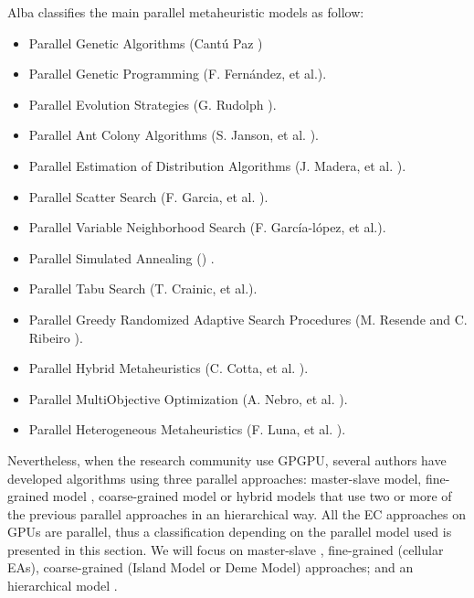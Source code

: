 \documentclass[prodmode,acmtecs]{acmsmall}
\begin{document}
Alba classifies the main parallel metaheuristic models as follow:
\begin{itemize}
 \item Parallel Genetic Algorithms (Cant\'u Paz \cite{Cantu-Paz98asurvey}) %
\item Parallel Genetic Programming (F. Fernández, et al.\cite{springerlink:10.1023_A:1021873026259}).
\item Parallel Evolution Strategies (G. Rudolph \cite{Rudolph92parallelapproaches}).
\item Parallel Ant Colony Algorithms (S. Janson, et al. \cite{ParallelAntColony}).
\item Parallel Estimation of Distribution Algorithms (J. Madera, et al. \cite{springerlink:10.1007_3_540_32494_1_7}).
\item Parallel Scatter Search (F. Garcia, et al. \cite{GarciaLopez2003575}).
\item Parallel Variable Neighborhood Search (F. Garc\'ia-l\'opez, et al.\cite{Garcia_lopez_theparallel}).
\item Parallel Simulated Annealing (\cite{Genetic_parallelsimulated}) .
\item Parallel Tabu Search (T. Crainic, et al.\cite{Crainic97towardsa}).
\item Parallel Greedy Randomized Adaptive Search Procedures (M. Resende and C. Ribeiro \cite{Resendeparallelgreedy}).
\item Parallel Hybrid Metaheuristics (C. Cotta, et al. \cite{Cotta05e:parallel}). 
\item Parallel MultiObjective Optimization (A. Nebro, et al. \cite{Nebro07mocell:a}).
\item Parallel Heterogeneous Metaheuristics (F. Luna, et al. \cite{ANL04}). 
\end{itemize}

Nevertheless, when the research community use GPGPU, several authors have developed algorithms using three parallel approaches: master-slave model, fine-grained model \cite{jian_ming_li_efficient_2007}, coarse-grained model \cite{Maitre:2009:CGP:1569901_1570089} \cite{pospichalParallelGeneticAlgorithOnCUDA2010} or hybrid models that use two or more of the previous parallel approaches in an hierarchical way. All the EC approaches on GPUs are parallel, thus a classification depending on the parallel model used is presented in this section. We will focus on master-slave \cite{ZhangImplementationMasterSlave}, fine-grained (cellular EAs), coarse-grained (Island Model or Deme Model) approaches; and an hierarchical model \cite{Zhang2009}.
\end{document}
